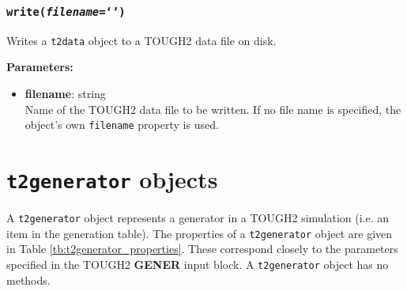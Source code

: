 \subsubsection{\texttt{write(\emph{filename}=`')}}

Writes a \texttt{t2data} object to a TOUGH2 data file on disk.

\textbf{Parameters:}
\begin{itemize}
\item \textbf{filename}: string\\
  Name of the TOUGH2 data file to be written.  If no file name is specified, the object's own \texttt{filename} property is used.
\end{itemize}

\section{\texttt{t2generator} objects}
\label{t2generator}

A \texttt{t2generator} object represents a generator in a TOUGH2 simulation (i.e. an item in the generation table).  The properties of a \texttt{t2generator} object are given in Table \ref{tb:t2generator_properties}.  These correspond closely to the parameters specified in the TOUGH2 \textbf{GENER} input block.  A \texttt{t2generator} object has no methods.

